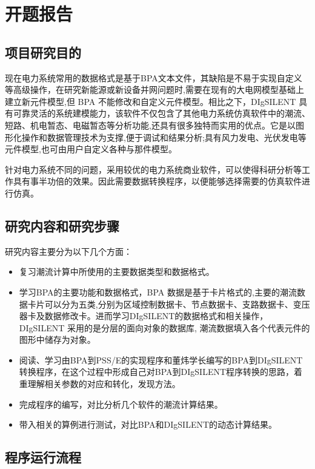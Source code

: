 \chapter{开题报告}

\section{项目研究目的}
现在电力系统常用的数据格式是基于BPA文本文件，其缺陷是不易于实现自定义等高级操作，在研究新能源或新设备并网问题时,需要在现有的大电网模型基础上建立新元件模型,但 BPA 不能修改和自定义元件模型。相比之下，DIgSILENT 具有可靠灵活的系统建模能力，该软件不仅包含了其他电力系统仿真软件中的潮流、短路、机电暂态、电磁暂态等分析功能,还具有很多独特而实用的优点。它是以图形化操作和数据管理技术为支撑,便于调试和结果分析;具有风力发电、光伏发电等元件模型,也可由用户自定义各种与那件模型。

针对电力系统不同的问题，采用较优的电力系统商业软件，可以使得科研分析等工作具有事半功倍的效果。因此需要数据转换程序，以便能够选择需要的仿真软件进行仿真。

\section{研究内容和研究步骤}
研究内容主要分为以下几个方面：

\begin{itemize}
\item 复习潮流计算中所使用的主要数据类型和数据格式。
\item 学习BPA的主要功能和数据格式，BPA 数据是基于卡片格式的,主要的潮流数据卡片可以分为五类,分别为区域控制数据卡、节点数据卡、支路数据卡、变压器卡及数据修改卡。进而学习DIgSILENT的数据格式和相关操作，DIgSILENT 采用的是分层的面向对象的数据库, 潮流数据填入各个代表元件的图形中储存为对象。
\item 阅读、学习由BPA到PSS/E的实现程序和董炜学长编写的BPA到DIgSILENT转换程序，在这个过程中形成自己对BPA到DIgSILENT程序转换的思路，着重理解相关参数的对应和转化，发现方法。
\item 完成程序的编写，对比分析几个软件的潮流计算结果。
\item 带入相关的算例进行测试，对比BPA和DIgSILENT的动态计算结果。
\end{itemize}

\section{程序运行流程}

%
%

